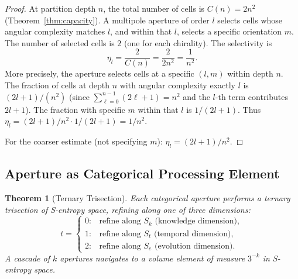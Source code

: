 \documentclass[twocolumn,10pt]{article}
\newtheorem{theorem}{Theorem}[section]
\theoremstyle{remark}
\newcommand{\Sk}{S_k}
\newcommand{\St}{S_t}
\newcommand{\Se}{S_e}
\begin{document}
\begin{proof}
At partition depth $n$, the total number of cells is $C(n) = 2n^2$ (Theorem~\ref{thm:capacity}). A multipole aperture of order $l$ selects cells whose angular complexity matches $l$, and within that $l$, selects a specific orientation $m$. The number of selected cells is $2$ (one for each chirality). The selectivity is
\begin{equation}
\eta_l = \frac{2}{C(n)} = \frac{2}{2n^2} = \frac{1}{n^2}.
\end{equation}
More precisely, the aperture selects cells at a specific $(l, m)$ within depth $n$. The fraction of cells at depth $n$ with angular complexity exactly $l$ is $(2l+1)/(n^2)$ (since $\sum_{\ell=0}^{n-1}(2\ell+1) = n^2$ and the $l$-th term contributes $2l+1$). The fraction with specific $m$ within that $l$ is $1/(2l+1)$. Thus $\eta_l = (2l+1)/n^2 \cdot 1/(2l+1) = 1/n^2$.

For the coarser estimate (not specifying $m$): $\eta_l = (2l+1)/n^2$.
\end{proof}

\subsection{Aperture as Categorical Processing Element}

\begin{theorem}[Ternary Trisection]
\label{thm:trisection}
Each categorical aperture performs a ternary trisection of S-entropy space, refining along one of three dimensions:
\begin{equation}
t = \begin{cases} 0: & \text{refine along } \Sk \text{ (knowledge dimension)}, \\ 1: & \text{refine along } \St \text{ (temporal dimension)}, \\ 2: & \text{refine along } \Se \text{ (evolution dimension)}. \end{cases}
\label{eq:trisection}
\end{equation}
A cascade of $k$ apertures navigates to a volume element of measure $3^{-k}$ in S-entropy space.
\end{theorem}
\end{document}
